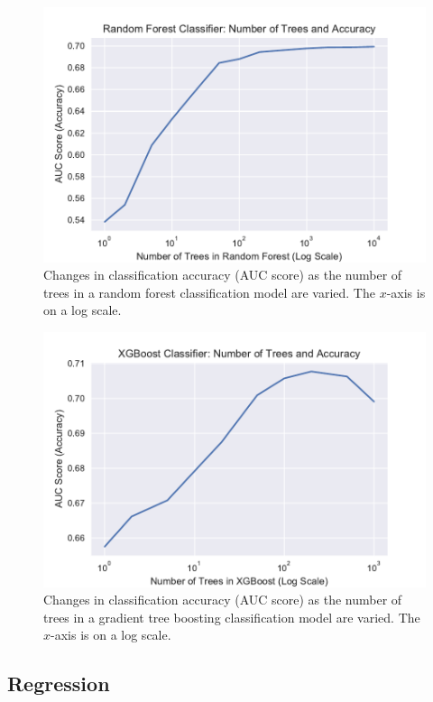 \documentclass[12pt]{article}
\begin{document}
\begin{figure}[!htbp]
    \centering
    \includegraphics[width=\textwidth]{graphics/num_trees_rfc}
    \caption{Changes in classification accuracy (AUC score) as the number of trees in a random forest classification model are varied. The $x$-axis is on a log scale.}
    \label{fig:num_trees_rfc}
\end{figure}

\begin{figure}[!htbp]
    \centering
    \includegraphics[width=\textwidth]{graphics/num_trees_xgbc}
    \caption{Changes in classification accuracy (AUC score) as the number of trees in a gradient tree boosting classification model are varied. The $x$-axis is on a log scale.}
    \label{fig:num_trees_xgbc}
\end{figure}

\subsection{Regression}
\end{document}
